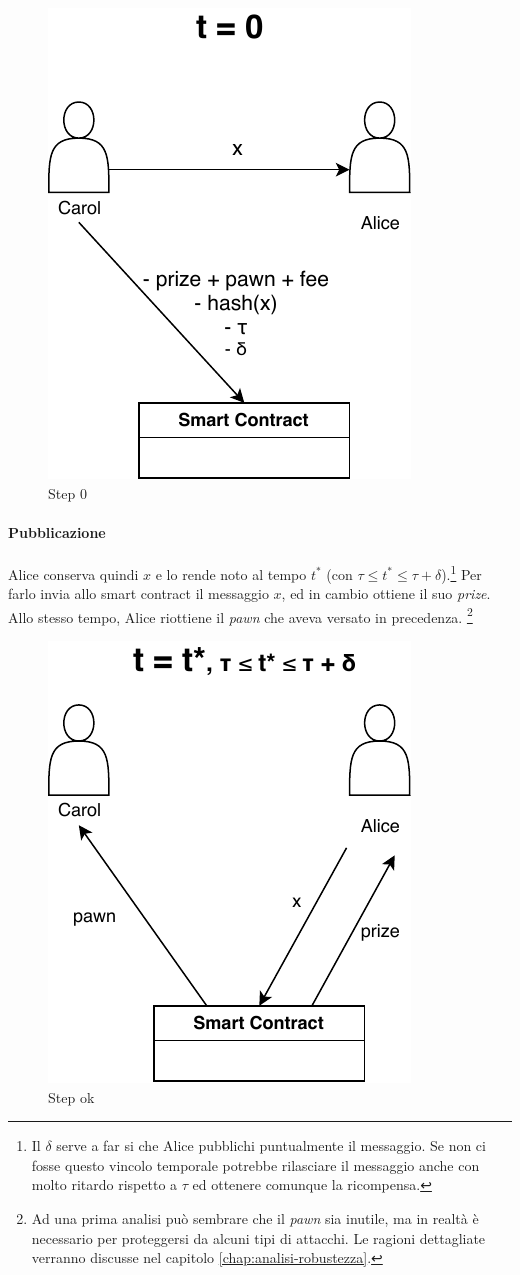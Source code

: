 \begin{figure}[H]
	\centering
	\includegraphics[width=0.3\linewidth]{images/chap_protocollo/base-creazione.pdf}
	\caption{Step 0}
\end{figure}

\paragraph{Pubblicazione}
Alice conserva quindi $ x $ e lo rende noto al tempo $ t^{*} $
(con $ \tau \leq t^{*} \leq \tau + \delta $).\footnote{Il $ \delta $ serve a far si che
	Alice pubblichi puntualmente il messaggio. Se non ci fosse questo vincolo temporale
	potrebbe rilasciare il messaggio anche con molto ritardo rispetto a
	$ \tau $ ed ottenere comunque
	la ricompensa.}
Per farlo invia allo smart contract il messaggio $ x $,
ed in cambio ottiene il suo \textit{prize}.
Allo stesso tempo, Alice riottiene il \textit{pawn} che aveva versato in precedenza.
\footnote{Ad una prima analisi può sembrare che il \textit{pawn} sia inutile,
	ma in realtà è necessario per proteggersi da alcuni tipi di attacchi.
	Le ragioni dettagliate verranno discusse nel capitolo \ref{chap:analisi-robustezza}.}
\begin{figure}[H]
	\centering
	\includegraphics[width=0.3\linewidth]{images/chap_protocollo/base-pubblicazione.pdf}
	\caption{Step ok}
\end{figure}

